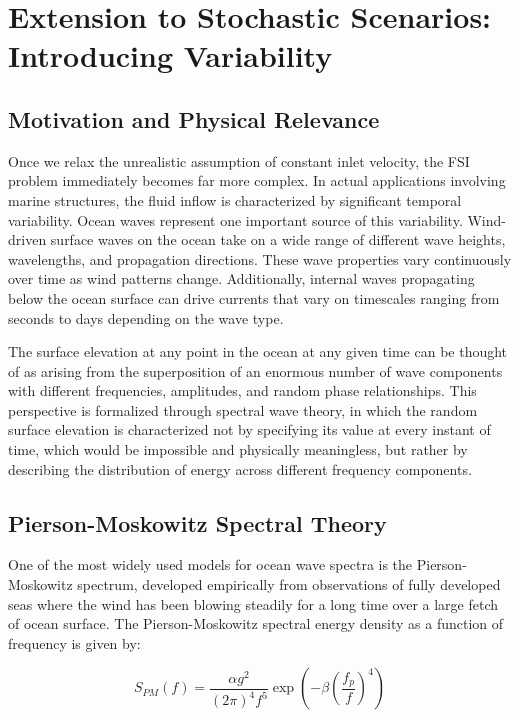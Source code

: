 ﻿\documentclass[a4paper,11pt]{article}
\theoremstyle{definition}
\begin{document}
\section{Extension to Stochastic Scenarios: Introducing Variability}

\subsection{Motivation and Physical Relevance}

Once we relax the unrealistic assumption of constant inlet velocity, the FSI problem immediately becomes far more complex. In actual applications involving marine structures, the fluid inflow is characterized by significant temporal variability. Ocean waves represent one important source of this variability. Wind-driven surface waves on the ocean take on a wide range of different wave heights, wavelengths, and propagation directions. These wave properties vary continuously over time as wind patterns change. Additionally, internal waves propagating below the ocean surface can drive currents that vary on timescales ranging from seconds to days depending on the wave type.

The surface elevation at any point in the ocean at any given time can be thought of as arising from the superposition of an enormous number of wave components with different frequencies, amplitudes, and random phase relationships. This perspective is formalized through spectral wave theory, in which the random surface elevation is characterized not by specifying its value at every instant of time, which would be impossible and physically meaningless, but rather by describing the distribution of energy across different frequency components.

\subsection{Pierson-Moskowitz Spectral Theory}

One of the most widely used models for ocean wave spectra is the Pierson-Moskowitz spectrum, developed empirically from observations of fully developed seas where the wind has been blowing steadily for a long time over a large fetch of ocean surface. The Pierson-Moskowitz spectral energy density as a function of frequency is given by:

\begin{equation}
S_{PM}(f) = \frac{\alpha g^2}{(2\pi)^4 f^5} \exp\left( -\beta \left(\frac{f_p}{f}\right)^4 \right)
\label{eq:pierson_moskowitz}
\end{equation}
\end{document}
